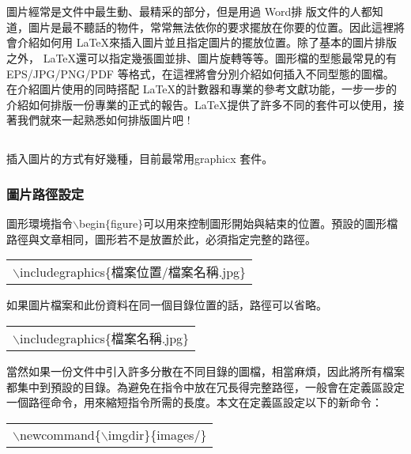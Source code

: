%
\chapter{}
圖片經常是文件中最生動、最精采的部分，但是用過 Word排 版文件的人都知道，圖片是最不聽話的物件，常常無法依你的要求擺放在你要的位置。因此這裡將會介紹如何用 \LaTeX 來插入圖片並且指定圖片的擺放位置。除了基本的圖片排版之外， \LaTeX 還可以指定幾張圖並排、圖片旋轉等等。圖形檔的型態最常見的有 {\C EPS/JPG/PNG/PDF} 等格式，在這裡將會分別介紹如何插入不同型態的圖檔。在介紹圖片使用的同時搭配 \LaTeX 的計數器和專業的參考文獻功能，一步一步的介紹如何排版一份專業的正式的報告。\LaTeX 提供了許多不同的套件可以使用，接著我們就來一起熟悉如何排版圖片吧 !

\section{}
插入圖片的方式有好幾種，目前最常用{\A graphicx} 套件。

\subsection{圖片路徑設定}
圖形環境指令$\backslash$begin$\lbrace$figure$\rbrace$可以用來控制圖形開始與結束的位置。預設的圖形檔路徑與文章相同，圖形若不是放置於此，必須指定完整的路徑。

\begin{center}\colorbox{slight}{\begin{tabular}{p{}}
	{\A $\backslash$includegraphics\{檔案位置/檔案名稱.jpg\}}
\end{tabular}}\end{center}
\bigskip
如果圖片檔案和此份資料在同一個目錄位置的話，路徑可以省略。
\begin{center}\colorbox{slight}{\begin{tabular}{p{}}
	{\A $\backslash$includegraphics\{檔案名稱.jpg\}}
\end{tabular}}\end{center}
當然如果一份文件中引入許多分散在不同目錄的圖檔，相當麻煩，因此將所有檔案都集中到預設的目錄。為避免在指令中放在冗長得完整路徑，一般會在定義區設定一個路徑命令，用來縮短指令所需的長度。本文在定義區設定以下的新命令：
\smallskip
\begin{center}\colorbox{slight}{\begin{tabular}{p{}}
	{\A $\backslash$newcommand\{$\backslash$imgdir\}\{images/\}}
\end{tabular}}\end{center}
\smallskip

